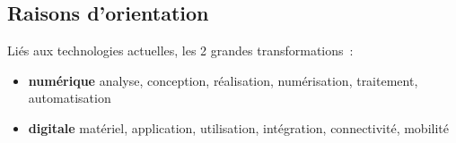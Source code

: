 \documentclass[20pt]{extarticle}
\begin{document}
\subsection{Raisons d’orientation}
Liés aux technologies actuelles, les 2 grandes transformations :
\begin{itemize}
\item{\textbf{numérique}\newline
analyse, conception, réalisation,\newline
numérisation, traitement, automatisation}
\item{\textbf{digitale}\newline
matériel, application, utilisation,\newline
intégration, connectivité, mobilité}
\end{itemize}
\pagebreak
\end{document}
